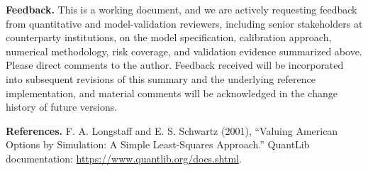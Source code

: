 \documentclass[conference]{IEEEtran}
\begin{document}
\textbf{Feedback.} This is a working document, and we are actively requesting feedback from quantitative and model-validation reviewers, including senior stakeholders at counterparty institutions, on the model specification, calibration approach, numerical methodology, risk coverage, and validation evidence summarized above. Please direct comments to the author. Feedback received will be incorporated into subsequent revisions of this summary and the underlying reference implementation, and material comments will be acknowledged in the change history of future versions.

\vspace{1pt}
\textbf{References.} F. A. Longstaff and E. S. Schwartz (2001), ``Valuing American Options by Simulation: A Simple Least-Squares Approach.'' QuantLib documentation: \url{https://www.quantlib.org/docs.shtml}.
\end{document}
